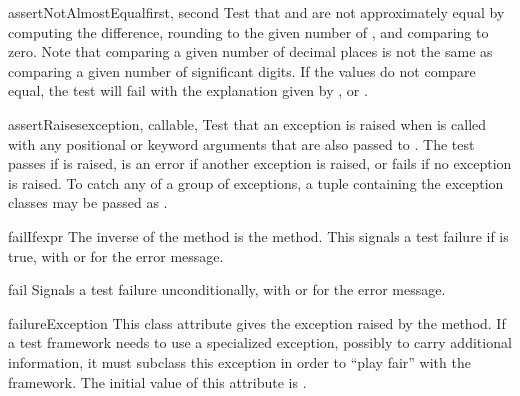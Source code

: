 \begin{methoddesc}[TestCase]{assertNotAlmostEqual}{first, second}
  Test that  and  are not approximately equal
  by computing the difference, rounding to the given number of ,
  and comparing to zero.  Note that comparing a given number of decimal places
  is not the same as comparing a given number of significant digits.
  If the values do not compare equal, the test will fail with the explanation
  given by , or .  
\end{methoddesc}

\begin{methoddesc}[TestCase]{assertRaises}{exception, callable, \moreargs}
  Test that an exception is raised when  is called with
  any positional or keyword arguments that are also passed to
  .  The test passes if  is
  raised, is an error if another exception is raised, or fails if no
  exception is raised.  To catch any of a group of exceptions, a tuple
  containing the exception classes may be passed as .
\end{methoddesc}

\begin{methoddesc}[TestCase]{failIf}{expr}
  The inverse of the  method is the
   method.  This signals a test failure if 
  is true, with  or  for the error message.
\end{methoddesc}

\begin{methoddesc}[TestCase]{fail}{}
  Signals a test failure unconditionally, with  or
   for the error message.
\end{methoddesc}

\begin{memberdesc}[TestCase]{failureException}
  This class attribute gives the exception raised by the
   method.  If a test framework needs to use a
  specialized exception, possibly to carry additional information, it
  must subclass this exception in order to ``play fair'' with the
  framework.  The initial value of this attribute is
  .
\end{memberdesc}


